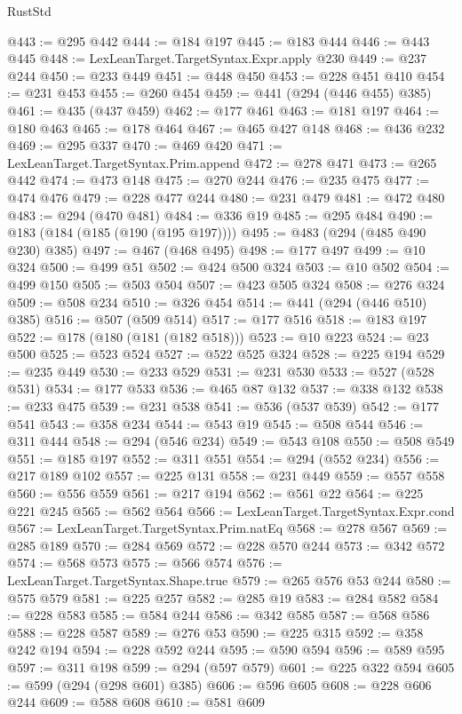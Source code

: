 \begin{lexlean}{RustStd}
\begin{coremodule}
@443 := @295 @442
@444 := @184 @197
@445 := @183 @444
@446 := @443 @445
@448 := LexLeanTarget.TargetSyntax.Expr.apply @230
@449 := @237 @244
@450 := @233 @449
@451 := @448 @450
@453 := @228 @451 @410
@454 := @231 @453
@455 := @260 @454
@459 := @441 (@294 (@446 @455) @385)
@461 := @435 (@437 @459)
@462 := @177 @461
@463 := @181 @197
@464 := @180 @463
@465 := @178 @464
@467 := @465 @427 @148
@468 := @436 @232
@469 := @295 @337
@470 := @469 @420
@471 := LexLeanTarget.TargetSyntax.Prim.append
@472 := @278 @471
@473 := @265 @442
@474 := @473 @148
@475 := @270 @244
@476 := @235 @475
@477 := @474 @476
@479 := @228 @477 @244
@480 := @231 @479
@481 := @472 @480
@483 := @294 (@470 @481)
@484 := @336 @19
@485 := @295 @484
@490 := @183 (@184 (@185 (@190 (@195 @197))))
@495 := @483 (@294 (@485 @490 @230) @385)
@497 := @467 (@468 @495)
@498 := @177 @497
@499 := @10 @324
@500 := @499 @51
@502 := @424 @500 @324
@503 := @10 @502
@504 := @499 @150
@505 := @503 @504
@507 := @423 @505 @324
@508 := @276 @324
@509 := @508 @234
@510 := @326 @454
@514 := @441 (@294 (@446 @510) @385)
@516 := @507 (@509 @514)
@517 := @177 @516
@518 := @183 @197
@522 := @178 (@180 (@181 (@182 @518)))
@523 := @10 @223
@524 := @23 @500
@525 := @523 @524
@527 := @522 @525 @324
@528 := @225 @194
@529 := @235 @449
@530 := @233 @529
@531 := @231 @530
@533 := @527 (@528 @531)
@534 := @177 @533
@536 := @465 @87 @132
@537 := @338 @132
@538 := @233 @475
@539 := @231 @538
@541 := @536 (@537 @539)
@542 := @177 @541
@543 := @358 @234
@544 := @543 @19
@545 := @508 @544
@546 := @311 @444
@548 := @294 (@546 @234)
@549 := @543 @108
@550 := @508 @549
@551 := @185 @197
@552 := @311 @551
@554 := @294 (@552 @234)
@556 := @217 @189 @102
@557 := @225 @131
@558 := @231 @449
@559 := @557 @558
@560 := @556 @559
@561 := @217 @194
@562 := @561 @22
@564 := @225 @221 @245
@565 := @562 @564
@566 := LexLeanTarget.TargetSyntax.Expr.cond
@567 := LexLeanTarget.TargetSyntax.Prim.natEq
@568 := @278 @567
@569 := @285 @189
@570 := @284 @569
@572 := @228 @570 @244
@573 := @342 @572
@574 := @568 @573
@575 := @566 @574
@576 := LexLeanTarget.TargetSyntax.Shape.true
@579 := @265 @576 @53 @244
@580 := @575 @579
@581 := @225 @257
@582 := @285 @19
@583 := @284 @582
@584 := @228 @583
@585 := @584 @244
@586 := @342 @585
@587 := @568 @586
@588 := @228 @587
@589 := @276 @53
@590 := @225 @315
@592 := @358 @242 @194
@594 := @228 @592 @244
@595 := @590 @594
@596 := @589 @595
@597 := @311 @198
@599 := @294 (@597 @579)
@601 := @225 @322 @594
@605 := @599 (@294 (@298 @601) @385)
@606 := @596 @605
@608 := @228 @606 @244
@609 := @588 @608
@610 := @581 @609

\end{coremodule}
\end{lexlean}
